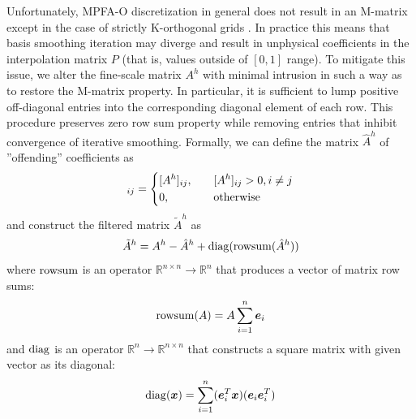 Unfortunately, MPFA-O discretization in general does not result in an M-matrix except in the case of strictly K-orthogonal grids \cite{Aavatsmark2002}.   In practice this means that basis smoothing iteration may diverge and result in unphysical coefficients in the interpolation matrix $P$ (that is, values outside of $[0,1]$ range).   To mitigate this issue, we alter the fine-scale matrix $A^h$ with minimal intrusion in such a way as to restore the M-matrix property.   In particular, it is sufficient to lump positive off-diagonal entries into the corresponding diagonal element of each row.   This procedure preserves zero row sum property while removing entries that inhibit convergence of iterative smoothing.   Formally, we can define the matrix $\hat{A}^h$ of ''offending'' coefficients as
\begin{align}
    [\hat{A}^h]_{ij} = 
    \begin{dcases}
        [A^h]_{ij}, \quad &[A^h]_{ij} > 0, i \neq j \\
        0, \quad &\text{otherwise}
    \end{dcases}
    \label{eq:msrsb_mpfa_filtering_offd}
\end{align}
and construct the filtered matrix $\tilde{A}^h$ as
\begin{align}
    \tilde{A}^h = A^h - \hat{A}^h + \operatorname{diag}({\operatorname{rowsum}(\hat{A}^h)})
    \label{eq:msrsb_mpfa_filtering}
\end{align}
where $\operatorname{rowsum}$ is an operator $\mathbb{R}^{n \times n} \to \mathbb{R}^n$ that produces a vector of matrix row sums:
\begin{align}
    \operatorname{rowsum}(A) = A\sum\limits_{i=1}^n \bm{e}_i
    \label{eq:rowsum_operator}
\end{align}
and $\operatorname{diag}$ is an operator $\mathbb{R}^{n} \to \mathbb{R}^{n \times n}$ that constructs a square matrix with given vector as its diagonal:
\begin{align}
    \operatorname{diag}(\bm{x}) = \sum\limits_{i=1}^n (\bm{e}_i^T \bm{x}) (\bm{e}_i \bm{e}_i^T)
    \label{eq:diag_operator}
\end{align}
